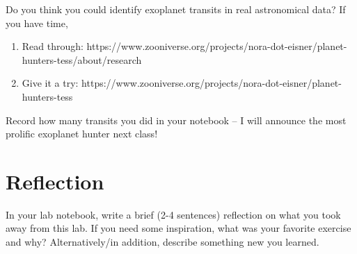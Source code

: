 \documentclass[11pt]{article}%
\begin{document}
\noindent Do you think you could identify exoplanet transits in real astronomical data? If you have time,

\begin{enumerate}
\item Read through: https://www.zooniverse.org/projects/nora-dot-eisner/planet-hunters-tess/about/research
\item Give it a try: https://www.zooniverse.org/projects/nora-dot-eisner/planet-hunters-tess
\end{enumerate}

Record how many transits you did in your notebook -- I will announce the most prolific exoplanet hunter next class!

\section{Reflection} 

\noindent In your lab notebook, write a brief (2-4 sentences) reflection on what you took away from this lab. If you need some inspiration, what was your favorite exercise and why? Alternatively/in addition, describe something new you learned.
\end{document}
